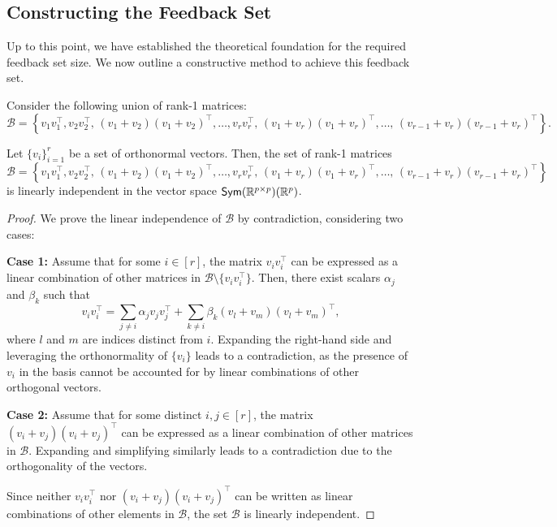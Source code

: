 \subsection{Constructing the Feedback Set}

Up to this point, we have established the theoretical foundation for the required feedback set size. We now outline a constructive method to achieve this feedback set.

Consider the following union of rank-1 matrices:
\[
    \mathcal{B} = \left\{
        v_1 v_1^{\top},
        v_2 v_2^{\top}, \, (v_1 + v_2)(v_1 + v_2)^{\top},
        \ldots,
        v_r v_r^{\top}, \, (v_1 + v_r)(v_1 + v_r)^{\top}, \ldots, \, (v_{r-1} + v_r)(v_{r-1} + v_r)^{\top}
    \right\}.
\]
\begin{lemma}\label{lem:orthobasis}
    Let $\{v_i\}_{i=1}^r$ be a set of orthonormal vectors. Then, the set of rank-1 matrices
    \[
        \mathcal{B} = \left\{
            v_1 v_1^{\top},
            v_2 v_2^{\top}, \, (v_1 + v_2)(v_1 + v_2)^{\top},
            \ldots,
            v_r v_r^{\top}, \, (v_1 + v_r)(v_1 + v_r)^{\top}, \ldots, \, (v_{r-1} + v_r)(v_{r-1} + v_r)^{\top}
        \right\}
    \]
    is linearly independent in the vector space $\textsf{Sym}(\mathbb{R}^{p\times p})(\mathbb{R}^p)$.
\end{lemma}
\begin{proof}
    We prove the linear independence of $\mathcal{B}$ by contradiction, considering two cases:

    \textbf{Case 1:} Assume that for some $i \in [r]$, the matrix $v_i v_i^{\top}$ can be expressed as a linear combination of other matrices in $\mathcal{B} \setminus \{v_i v_i^{\top}\}$. Then, there exist scalars $\alpha_j$ and $\beta_k$ such that
    \[
        v_i v_i^{\top} = \sum_{j \neq i} \alpha_j v_j v_j^{\top} + \sum_{k \neq i} \beta_k (v_l + v_m)(v_l + v_m)^{\top},
    \]
    where $l$ and $m$ are indices distinct from $i$. Expanding the right-hand side and leveraging the orthonormality of $\{v_i\}$ leads to a contradiction, as the presence of $v_i$ in the basis cannot be accounted for by linear combinations of other orthogonal vectors.

    \textbf{Case 2:} Assume that for some distinct $i, j \in [r]$, the matrix $(v_i + v_j)(v_i + v_j)^{\top}$ can be expressed as a linear combination of other matrices in $\mathcal{B}$. Expanding and simplifying similarly leads to a contradiction due to the orthogonality of the vectors.

    Since neither $v_i v_i^{\top}$ nor $(v_i + v_j)(v_i + v_j)^{\top}$ can be written as linear combinations of other elements in $\mathcal{B}$, the set $\mathcal{B}$ is linearly independent.
\end{proof}

